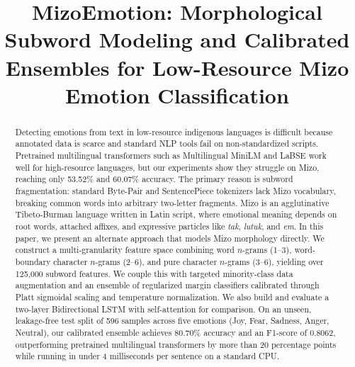 \documentclass[conference]{IEEEtran}
\begin{document}
\title{MizoEmotion: Morphological Subword Modeling and Calibrated Ensembles for Low-Resource Mizo Emotion Classification}

\author{
}

\maketitle

\begin{abstract}
Detecting emotions from text in low-resource indigenous languages is difficult because annotated data is scarce and standard NLP tools fail on non-standardized scripts. Pretrained multilingual transformers such as Multilingual MiniLM and LaBSE work well for high-resource languages, but our experiments show they struggle on Mizo, reaching only 53.52\% and 60.07\% accuracy. The primary reason is subword fragmentation: standard Byte-Pair and SentencePiece tokenizers lack Mizo vocabulary, breaking common words into arbitrary two-letter fragments. Mizo is an agglutinative Tibeto-Burman language written in Latin script, where emotional meaning depends on root words, attached affixes, and expressive particles like \textit{tak}, \textit{lutuk}, and \textit{em}. In this paper, we present an alternate approach that models Mizo morphology directly. We construct a multi-granularity feature space combining word $n$-grams (1--3), word-boundary character $n$-grams (2--6), and pure character $n$-grams (3--6), yielding over 125,000 subword features. We couple this with targeted minority-class data augmentation and an ensemble of regularized margin classifiers calibrated through Platt sigmoidal scaling and temperature normalization. We also build and evaluate a two-layer Bidirectional LSTM with self-attention for comparison. On an unseen, leakage-free test split of 596 samples across five emotions (Joy, Fear, Sadness, Anger, Neutral), our calibrated ensemble achieves 80.70\% accuracy and an F1-score of 0.8062, outperforming pretrained multilingual transformers by more than 20 percentage points while running in under 4 milliseconds per sentence on a standard CPU.
\end{abstract}
\end{document}
